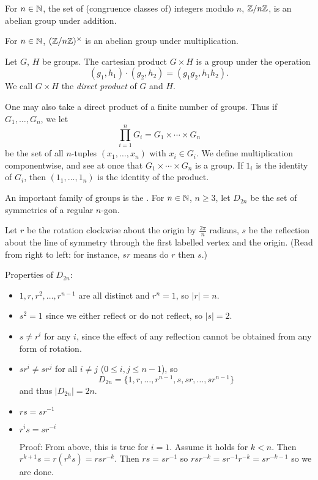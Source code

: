 \begin{example}
For $n\in\mathbb N$, the set of (congruence classes of) integers modulo $n$, $\mathbb Z/n\mathbb Z$, is an abelian group under addition.

For $n\in\mathbb N$, $(\mathbb Z/n\mathbb Z)^\times$ is an abelian group under multiplication.
\end{example}

\begin{example}
Let $G$, $H$ be groups. The cartesian product $G\times H$ is a group under the operation
\[(g_1,h_1)\cdot(g_2,h_2)=(g_1g_2,h_1h_2).\]
We call $G\times H$ the \emph{direct product} of $G$ and $H$.

One may also take a direct product of a finite number of groups. Thus if $G_1,\dots,G_n$, we let
\[\prod_{i=1}^{n}G_i=G_1\times\cdots\times G_n\]
be the set of all $n$-tuples $(x_1,\dots,x_n)$ with $x_i\in G_i$. We define multiplication componentwise, and see at once that $G_1\times\cdots\times G_n$ is a group. If $1_i$ is the identity of $G_i$, then $(1_1,\dots,1_n)$ is the identity of the product.
\end{example}

\begin{example}
An important family of groups is the . For $n\in\mathbb N$, $n\ge3$, let $D_{2n}$ be the set of symmetries of a regular $n$-gon.

Let $r$ be the rotation clockwise about the origin by $\frac{2\pi}{n}$ radians, $s$ be the reflection about the line of symmetry through the first labelled vertex and the origin. (Read from right to left: for instance, $sr$ means do $r$ then $s$.)

Properties of $D_{2n}$:
\begin{itemize}
\item $1,r,r^2,\dots,r^{n-1}$ are all distinct and $r^n=1$, so $|r|=n$.
\item $s^2=1$ since we either reflect or do not reflect, so $|s|=2$.
\item $s\neq r^i$ for any $i$, since the effect of any reflection cannot be obtained from any form of rotation.
\item $sr^i\neq sr^j$ for all $i\neq j$ ($0\le i,j\le n-1$), so
\[D_{2n}=\{1,r,\dots,r^{n-1},s,sr,\dots,sr^{n-1}\}\]
and thus $|D_{2n}|=2n$.
\item $rs=sr^{-1}$
\item $r^is=sr^{-i}$

Proof: From above, this is true for $i=1$. Assume it holds for $k<n$. Then $r^{k+1}s=r(r^ks)=rsr^{-k}$. Then $rs=sr^{-1}$ so $rsr^{-k}=sr^{-1}r^{-k}=sr^{-k-1}$ so we are done.
\end{itemize}
\end{example}

